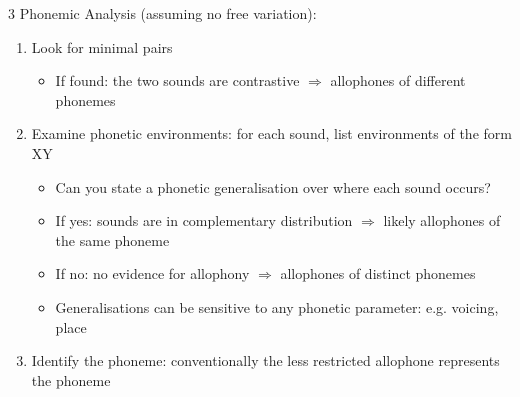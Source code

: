 \documentclass[12pt, a4paper]{article}
\begin{document}
\begin{multicols*}{3}
Phonemic Analysis (assuming no free variation):
\begin{enumerate}[\roman*.]
  \item Look for minimal pairs
    \begin{itemize}[leftmargin=*]\vspace{3pt}
      \item If found: the two sounds are contrastive $\Rightarrow$ allophones of different phonemes
    \end{itemize}
  \item Examine phonetic environments: for each sound, list environments of the form X\underline{\hspace{1em}}Y
    \begin{itemize}[leftmargin=*]\vspace{3pt}
      \item Can you state a phonetic generalisation over where each sound occurs?
      \item If yes: sounds are in complementary distribution $\Rightarrow$ likely allophones of the same phoneme
      \item If no: no evidence for allophony $\Rightarrow$ allophones of distinct phonemes
      \item Generalisations can be sensitive to any phonetic parameter: e.g. voicing, place
    \end{itemize}
  \item Identify the phoneme: conventionally the less restricted allophone represents the phoneme
\end{enumerate}
\vspace{-1em}
\colbreak


\end{multicols*}
\end{document}

